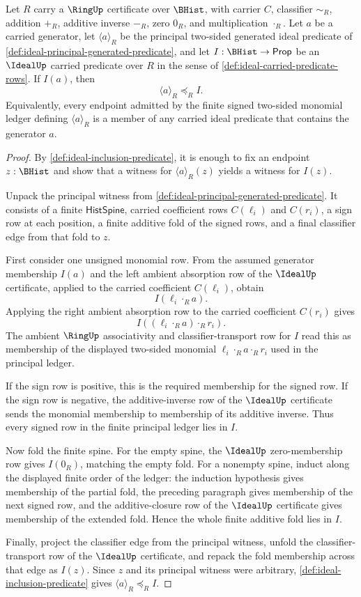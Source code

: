\begin{theorem}
\label{thm:ideal-principal-generated-least-over-generator}
Let $R$ carry a $\RingUp$ certificate over $\BHist$, with carrier $C$, classifier $\sim_R$, addition $+_R$, additive inverse $-_R$, zero $0_R$, and multiplication $\cdot_R$. Let $a$ be a carried generator, let $\langle a\rangle_R$ be the principal two-sided generated ideal predicate of \autoref{def:ideal-principal-generated-predicate}, and let $I:\BHist\to\mathsf{Prop}$ be an $\IdealUp$ carried predicate over $R$ in the sense of \autoref{def:ideal-carried-predicate-rows}. If $I(a)$, then
$$
\langle a\rangle_R\preceq_R I.
$$
Equivalently, every endpoint admitted by the finite signed two-sided monomial ledger defining $\langle a\rangle_R$ is a member of any carried ideal predicate that contains the generator $a$.
\end{theorem}
\begin{proof}
By \autoref{def:ideal-inclusion-predicate}, it is enough to fix an endpoint $z:\BHist$ and show that a witness for $\langle a\rangle_R(z)$ yields a witness for $I(z)$.

Unpack the principal witness from \autoref{def:ideal-principal-generated-predicate}. It consists of a finite $\mathsf{HistSpine}$, carried coefficient rows $C(\ell_i)$ and $C(r_i)$, a sign row at each position, a finite additive fold of the signed rows, and a final classifier edge from that fold to $z$.

First consider one unsigned monomial row. From the assumed generator membership $I(a)$ and the left ambient absorption row of the $\IdealUp$ certificate, applied to the carried coefficient $C(\ell_i)$, obtain
$$
I(\ell_i\cdot_R a).
$$
Applying the right ambient absorption row to the carried coefficient $C(r_i)$ gives
$$
I((\ell_i\cdot_R a)\cdot_R r_i).
$$
The ambient $\RingUp$ associativity and classifier-transport row for $I$ read this as membership of the displayed two-sided monomial $\ell_i\cdot_R a\cdot_R r_i$ used in the principal ledger.

If the sign row is positive, this is the required membership for the signed row. If the sign row is negative, the additive-inverse row of the $\IdealUp$ certificate sends the monomial membership to membership of its additive inverse. Thus every signed row in the finite principal ledger lies in $I$.

Now fold the finite spine. For the empty spine, the $\IdealUp$ zero-membership row gives $I(0_R)$, matching the empty fold. For a nonempty spine, induct along the displayed finite order of the ledger: the induction hypothesis gives membership of the partial fold, the preceding paragraph gives membership of the next signed row, and the additive-closure row of the $\IdealUp$ certificate gives membership of the extended fold. Hence the whole finite additive fold lies in $I$.

Finally, project the classifier edge from the principal witness, unfold the classifier-transport row of the $\IdealUp$ certificate, and repack the fold membership across that edge as $I(z)$. Since $z$ and its principal witness were arbitrary, \autoref{def:ideal-inclusion-predicate} gives $\langle a\rangle_R\preceq_R I$.
\end{proof}
